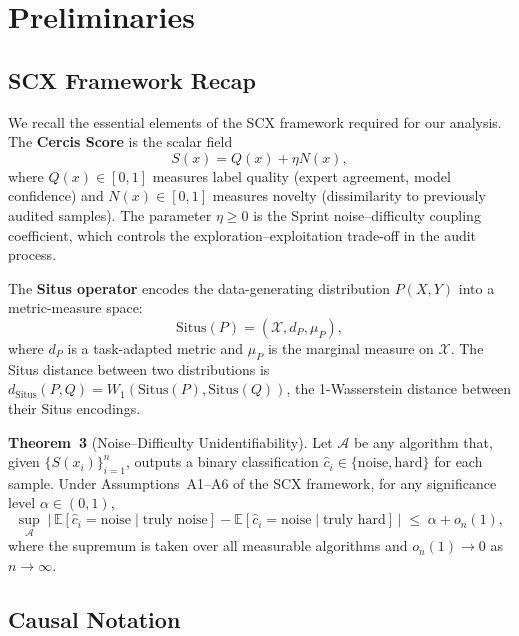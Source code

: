 \documentclass[12pt,a4paper]{article}
\newcommand{\E}{\mathbb{E}}
\newcommand{\cX}{\mathcal{X}}
\newcommand{\cA}{\mathcal{A}}
\newcommand{\Situs}{\mathrm{Situs}}
\begin{document}
\section{Preliminaries}

\subsection{SCX Framework Recap}

We recall the essential elements of the SCX framework required for our
analysis.  The \textbf{Cercis Score} is the scalar field
\begin{equation}\label{eq:cercis}
    S(x) = Q(x) + \eta N(x),
\end{equation}
where $Q(x) \in [0,1]$ measures label quality (expert agreement, model
confidence) and $N(x) \in [0,1]$ measures novelty (dissimilarity to previously
audited samples).  The parameter $\eta \geq 0$ is the Sprint noise--difficulty
coupling coefficient, which controls the exploration--exploitation trade-off in
the audit process.

The \textbf{Situs operator} encodes the data-generating distribution $P(X,Y)$
into a metric-measure space:
\begin{equation}\label{eq:situs}
    \Situs(P) = (\cX, d_P, \mu_P),
\end{equation}
where $d_P$ is a task-adapted metric and $\mu_P$ is the marginal measure on
$\cX$.  The Situs distance between two distributions is
$d_{\Situs}(P, Q) = W_1(\Situs(P), \Situs(Q))$, the 1-Wasserstein distance
between their Situs encodings.

\textbf{Theorem~3} (Noise--Difficulty Unidentifiability).  Let
$\cA$ be any algorithm that, given $\{S(x_i)\}_{i=1}^n$, outputs a binary
classification $\hat{c}_i \in \{\text{noise}, \text{hard}\}$ for each sample.
Under Assumptions~A1--A6 of the SCX framework, for any significance level
$\alpha \in (0,1)$,
\begin{equation}\label{eq:thm3}
    \sup_{\cA}\; \big|\,\E[\hat{c}_i = \text{noise} \mid \text{truly noise}]
    - \E[\hat{c}_i = \text{noise} \mid \text{truly hard}]\,\big|
    \;\leq\; \alpha + o_n(1),
\end{equation}
where the supremum is taken over all measurable algorithms and $o_n(1) \to 0$
as $n \to \infty$.

\subsection{Causal Notation}
\end{document}
